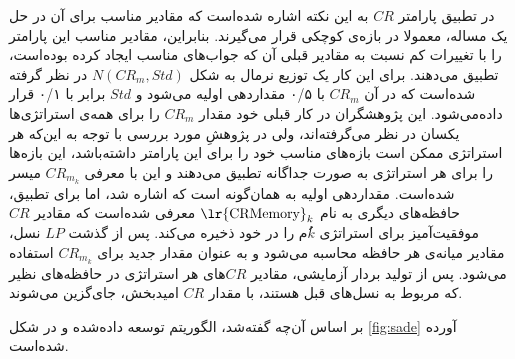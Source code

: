 \documentclass[12pt,a4paper]{article}
\theoremstyle{definition}
\theoremstyle{theorem}
\theoremstyle{definition}
\begin{document}
در تطبیق پارامتر 
$\mathit{CR}$
به این نکته اشاره شده‌است که مقادیر مناسب برای آن در حل یک مساله، معمولا در بازه‌ی کوچکی قرار می‌گیرند. بنابراین، مقادیر مناسب این پارامتر را با تغییرات کم نسبت به مقادیر قبلی آن که جواب‌های مناسب ایجاد کرده بوده‌است، تطبیق می‌دهند. برای این کار یک توزیع نرمال به شکل 
$N( {\mathit{CR}}_m , Std)$
در نظر گرفته‌ شده‌است که در آن 
$\mathit{CR}_m$
با ۰/۵ مقداردهی اولیه می‌شود و 
$Std$
برابر با ۰/۱ قرار داده‌می‌شود. این پژوهشگران در کار قبلی خود \cite{oldwork} مقدار 
$\mathit{CR}_m$
را برای همه‌ی استراتژی‌ها یکسان در نظر می‌گرفته‌اند، ولی در پژوهشِ مورد بررسی با توجه به این‌که هر استراتژی ممکن‌ است بازه‌های مناسب خود را برای این پارامتر داشته‌باشد، این بازه‌ها را برای هر استراتژی به صورت جداگانه تطبیق می‌دهند و این با معرفی 
$\mathit{CR}_{m_k}$
میسر شده‌است. مقداردهی اولیه به همان‌گونه‌ است که اشاره شد، اما برای تطبیق، حافظه‌های دیگری به نام 
$\text{\lr{CRMemory}}_k$
معرفی شده‌است که مقادیر 
$\mathit{CR}$
موفقیت‌آمیز برای استراتژی 
$k$ُم 
را در خود ذخیره می‌کند. پس از گذشت 
$\mathit{LP}$
نسل، مقادیر میانه‌ی هر حافظه محاسبه می‌شود و به عنوان مقدار جدید برای 
$\mathit{CR}_{m_k}$
استفاده می‌شود. پس از تولید بردار آزمایشی، مقادیر
$\mathit{CR}$های
هر استراتژی در حافظه‌های نظیر که مربوط به نسل‌های قبل هستند، با مقدار 
$\mathit{CR}$
امیدبخش، جای‌گزین می‌شوند. 

بر اساس آن‌چه گفته‌شد، الگوریتم 
توسعه داده‌شده و در شکل \ref{fig:sade} آورده شده‌است.
\end{document}
